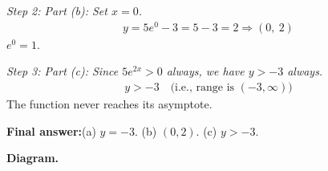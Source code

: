 \documentclass[11pt]{article}
\begin{document}
\textit{Step 2: Part (b): Set \( x = 0 \).}
\[\begin{gathered}
y = 5e^0 - 3 = 5 - 3 = 2 \Rightarrow (0,\ 2)
\end{gathered}\]
\( e^0 = 1 \).

\textit{Step 3: Part (c): Since \( 5e^{2x} > 0 \) always, we have \( y > -3 \) always.}
\[\begin{gathered}
y > -3 \quad \text{(i.e., range is } (-3, \infty))
\end{gathered}\]
The function never reaches its asymptote.

\begin{answerbox}
\textbf{Final answer:}\quad (a) \(\displaystyle  y = -3 \). (b) \(\displaystyle  (0, 2) \). (c) \(\displaystyle  y > -3 \).
\end{answerbox}
\textbf{Diagram.}
\end{document}
